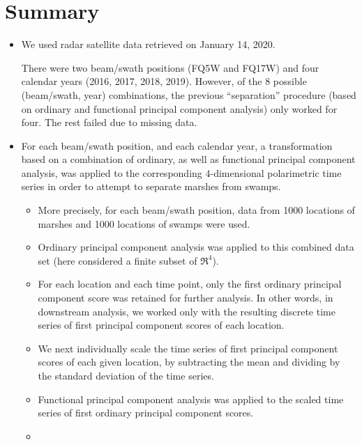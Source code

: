 
\section{Summary}
\setcounter{theorem}{0}

\renewcommand{\theenumi}{\roman{enumi}}
\renewcommand{\labelenumi}{\textnormal{(\theenumi)}$\;\;$}


\begin{itemize}
\item
	We used radar satellite data retrieved on January 14, 2020.

	There were two beam/swath positions (FQ5W and FQ17W) and
	four calendar years (2016, 2017, 2018, 2019).
	However, of the $8$ possible
	(beam/swath, year) combinations, the previous ``separation'' procedure
	(based on ordinary and functional principal component analysis) only worked for
	four. The rest failed due to missing data.
\item
	For each beam/swath position, and each calendar year, a transformation
	based on a combination of ordinary, as well as functional principal component analysis,
	was applied to the corresponding $4$-dimensional polarimetric time series
	in order to attempt to separate marshes from swamps.
	\begin{itemize}
	\item
		More precisely, for each beam/swath position, data from 1000 locations of marshes 
		and 1000 locations of swamps were used.
	\item
		Ordinary principal component analysis was applied to this combined data set
		(here considered a finite subset of $\Re^{4}$).
	\item
		For each location and each time point, only the first ordinary principal component score
		was retained for further analysis.
		In other words, in downstream analysis, we worked only with the resulting
		discrete time series of first principal component scores of each location.
	\item
		We next individually scale the time series of first principal component scores
		of each given location, by subtracting the mean and dividing by the standard deviation
		of the time series.
	\item
		Functional principal component analysis was applied to the scaled time series of
		first ordinary principal component scores.
	\item

\end{itemize}
\end{itemize}
